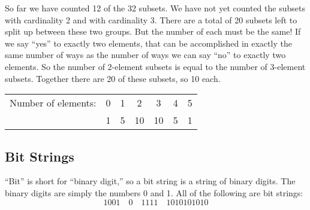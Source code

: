 \documentclass[10pt,]{book}
\theoremstyle{plain}
\theoremstyle{definition}
\theoremstyle{definition}
\theoremstyle{definition}
\numberwithin{equation}{section}
\newcommand{\hrulethin}  {\noalign{\hrule height 0.04em}}
\begin{document}
        So far we have counted 12 of the 32 subsets. We have not yet counted the subsets with cardinality 2 and with cardinality 3. There are a total of 20 subsets left to split up between these two groups. But the number of each must be the same! If we say ``yes'' to exactly two elements, that can be accomplished in exactly the same number of ways as the number of ways we can say ``no'' to exactly two elements. So the number of 2-element subsets is equal to the number of 3-element subsets. Together there are 20 of these subsets, so 10 each.
\leavevmode%
\begin{table}
\centering
\begin{tabular}{lllllll}
\multicolumn{1}{c}{Number of elements:}&\multicolumn{1}{c}{0}&\multicolumn{1}{c}{1}&\multicolumn{1}{c}{2}&\multicolumn{1}{c}{3}&\multicolumn{1}{c}{4}&\multicolumn{1}{c}{5}\tabularnewline\hrulethin
\multicolumn{1}{c}{Number of subsets:}&\multicolumn{1}{c}{1}&\multicolumn{1}{c}{5}&\multicolumn{1}{c}{10}&\multicolumn{1}{c}{10}&\multicolumn{1}{c}{5}&\multicolumn{1}{c}{1}
\end{tabular}
\end{table}
\typeout{************************************************}
\typeout{************************************************}
\subsection[
        Bit Strings
      ]{
        Bit Strings
      }\label{subsection-13}
 ``Bit'' is short for ``binary digit,'' so a bit string is a string of binary digits. The binary digits are simply the numbers 0 and 1. All of the following are bit strings:
      \begin{equation*}
        1001 \quad 0 \quad 1111 \quad 1010101010
      \end{equation*}
\par
\end{document}
